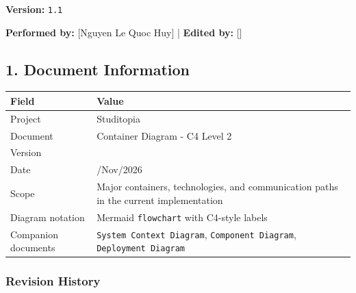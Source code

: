 \documentclass[12pt]{article}
\renewcommand{\baselinestretch}{1.5}
\begin{document}
\textbf{Version:} \texttt{1.1}
\par\medskip

\textbf{Performed by:} [Nguyen Le Quoc Huy] | \textbf{Edited by:} []
\par\medskip

\hypertarget{sec:1-document-information}{}
\subsection*{1. Document Information}
\par\medskip

\begingroup
\small
\renewcommand{\baselinestretch}{1.0}\selectfont
\renewcommand{\arraystretch}{1.15}
\setlength{\tabcolsep}{6pt}
\begin{longtable}{|>{\raggedright\arraybackslash}p{}|>{\raggedright\arraybackslash}p{}|}
\hline
\textbf{Field} & \textbf{Value} \\ \hline
\endhead
Project & Studitopia \\ \hline
Document & Container Diagram - C4 Level 2 \\ \hline
Version & 1.1 \\ \hline
Date & 28/Nov/2026 \\ \hline
Scope & Major containers, technologies, and communication paths in the current implementation \\ \hline
Diagram notation & Mermaid \texttt{flowchart} with C4-style labels \\ \hline
Companion documents & \texttt{System Context Diagram}, \texttt{Component Diagram}, \texttt{Deployment Diagram} \\ \hline
\end{longtable}
\endgroup
\par\medskip

\hypertarget{sec:revision-history}{}
\subsubsection*{Revision History}
\par\medskip
\end{document}
